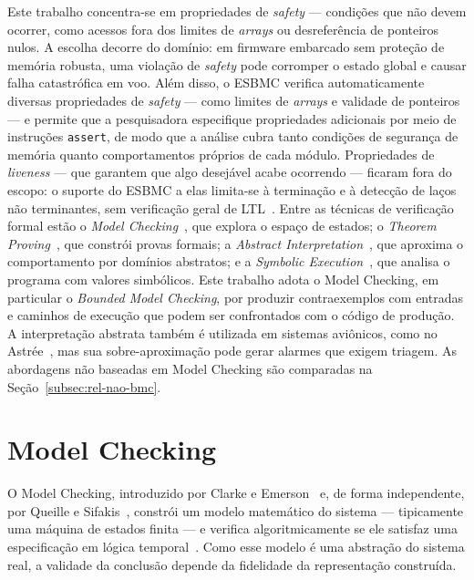 Este trabalho concentra-se em propriedades de \textit{safety} --- condições que
não devem ocorrer, como acessos fora dos limites de \textit{arrays} ou
desreferência de ponteiros nulos. A escolha decorre do domínio: em firmware
embarcado sem proteção de memória robusta, uma violação de \textit{safety} pode
corromper o estado global e causar falha catastrófica em voo. Além disso, o
ESBMC verifica automaticamente diversas propriedades de \textit{safety} --- como
limites de \textit{arrays} e validade de ponteiros --- e permite que a
pesquisadora especifique propriedades adicionais por meio de instruções
\texttt{assert}, de modo que a análise cubra tanto condições de segurança de
memória quanto comportamentos próprios de cada módulo. Propriedades de
\textit{liveness} --- que garantem que algo desejável acabe ocorrendo --- ficaram
fora do escopo: o suporte do ESBMC a elas limita-se à terminação e à detecção de
laços não terminantes, sem verificação geral de LTL~\cite{ESBMC_GitHub}.
Entre as técnicas de verificação formal estão o \textit{Model Checking}~\cite{Clarke1981}, que explora o espaço de estados; o \textit{Theorem Proving}~\cite{Huth2004}, que constrói provas formais; a \textit{Abstract Interpretation}~\cite{Cousot1977}, que aproxima o comportamento por domínios abstratos; e a \textit{Symbolic Execution}~\cite{King1976}, que analisa o programa com valores simbólicos. Este trabalho adota o Model Checking, em particular o \textit{Bounded Model Checking}, por produzir contraexemplos com entradas e caminhos de execução que podem ser confrontados com o código de produção. A interpretação abstrata também é utilizada em sistemas aviônicos, como no Astrée~\cite{Cousot2005Astree}, mas sua sobre-aproximação pode gerar alarmes que exigem triagem. As abordagens não baseadas em Model Checking são comparadas na Seção~\ref{subsec:rel-nao-bmc}.

\section{Model Checking}

O Model Checking, introduzido por Clarke e Emerson~\cite{Clarke1981} e, de forma
independente, por Queille e Sifakis~\cite{Queille1982}, constrói um modelo
matemático do sistema --- tipicamente uma máquina de estados finita --- e
verifica algoritmicamente se ele satisfaz uma especificação em lógica
temporal~\cite{Clarke1986}. Como esse modelo é uma abstração do sistema real, a
validade da conclusão depende da fidelidade da representação construída.


